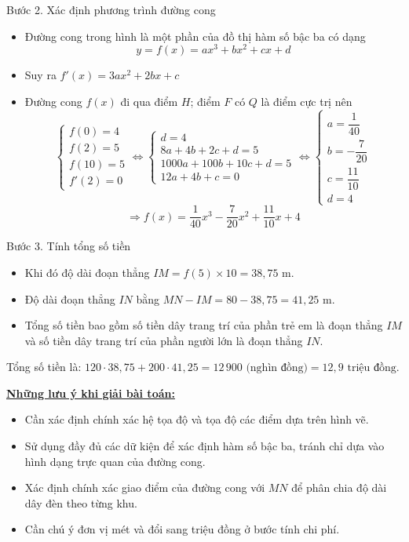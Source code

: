 \documentclass[12pt,a4paper,oneside]{book}
\theoremstyle{theorem}
\theoremstyle{definition}
\begin{document}
Bước 2. Xác định phương trình đường cong
\begin{itemize}
    \item Đường cong trong hình là một phần của đồ thị hàm số bậc ba có dạng
    $$y = f(x) = ax^3 + bx^2 + cx + d$$
    \item Suy ra $f'(x) = 3ax^2 + 2bx + c$
    \item Đường cong $f(x)$ đi qua điểm $H$; điểm $F$ có $Q$ là điểm cực trị nên
    $$\begin{cases} f(0) = 4 \\ f(2) = 5 \\ f(10) = 5 \\ f'(2) = 0 \end{cases} \Leftrightarrow \begin{cases} d = 4 \\ 8a + 4b + 2c + d = 5 \\ 1000a + 100b + 10c + d = 5 \\ 12a + 4b + c = 0 \end{cases} \Leftrightarrow \begin{cases} a = \dfrac{1}{40} \\ b = -\dfrac{7}{20} \\ c = \dfrac{11}{10} \\ d = 4 \end{cases}$$
    $$\Rightarrow f(x) = \dfrac{1}{40}x^3 - \dfrac{7}{20}x^2 + \dfrac{11}{10}x + 4$$
\end{itemize}

Bước 3. Tính tổng số tiền
\begin{itemize}
    \item Khi đó độ dài đoạn thẳng $IM = f(5) \times 10 = 38,75\text{ m}$.
    \item Độ dài đoạn thẳng $IN$ bằng $MN - IM = 80 - 38,75 = 41,25\text{ m}$.
    \item Tổng số tiền bao gồm số tiền dây trang trí của phần trẻ em là đoạn thẳng $IM$ và số tiền dây trang trí của phần người lớn là đoạn thẳng $IN$.
\end{itemize}

Tổng số tiền là: $120 \cdot 38,75 + 200 \cdot 41,25 = 12\,900\text{ (nghìn đồng)} {= 12,9}\text{ triệu đồng}$.
         
        \textbf{\underline{Những lưu ý khi giải bài toán:}}
        \begin{itemize}
            \item Cần xác định chính xác hệ tọa độ và tọa độ các điểm dựa trên hình vẽ.
            \item Sử dụng đầy đủ các dữ kiện để xác định hàm số bậc ba, tránh chỉ dựa vào hình dạng trực quan của đường cong.
            \item Xác định chính xác giao điểm của đường cong với \(MN\) để phân chia độ dài dây đèn theo từng khu.
            \item Cần chú ý đơn vị mét và đổi sang triệu đồng ở bước tính chi phí.
        \end{itemize}
        
\end{document}
